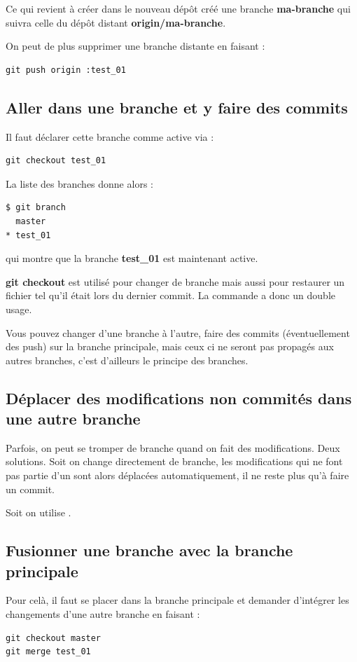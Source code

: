 \documentclass[a4paper,twoside]{article}
\begin{document}
Ce qui revient à créer dans le nouveau dépôt créé une branche \textbf{ma-branche} qui suivra celle du dépôt distant \textbf{origin/ma-branche}.

\bigskip

On peut de plus supprimer une branche distante en faisant : 
\begin{verbatim}
git push origin :test_01
\end{verbatim}

\subsection{Aller dans une branche et y faire des commits}
Il faut déclarer cette branche comme active via :
\begin{verbatim}
git checkout test_01
\end{verbatim}

La liste des branches donne alors :
\begin{verbatim}
$ git branch
  master
* test_01
\end{verbatim}
qui montre que la branche \textbf{test\_01} est maintenant active.

\begin{remarque}
\textbf{git checkout} est utilisé pour changer de branche mais aussi pour restaurer un fichier tel qu'il était lors du dernier commit. La commande a donc un double usage.
\end{remarque}

\begin{attention}
Vous pouvez changer d'une branche à l'autre, faire des commits (éventuellement des push) sur la branche principale, mais ceux ci ne seront pas propagés aux autres branches, c'est d'ailleurs le principe des branches. 
\end{attention}

\subsection{Déplacer des modifications non commités dans une autre branche}
Parfois, on peut se tromper de branche quand on fait des modifications. Deux solutions. Soit on change directement de branche, les modifications qui ne font pas partie d'un  sont alors déplacées automatiquement, il ne reste plus qu'à faire un commit. 

Soit on utilise  .

\subsection{Fusionner une branche avec la branche principale}
Pour celà, il faut se placer dans la branche principale et demander d'intégrer les changements d'une autre branche en faisant : 
\begin{verbatim}
git checkout master
git merge test_01
\end{verbatim}
\end{document}
